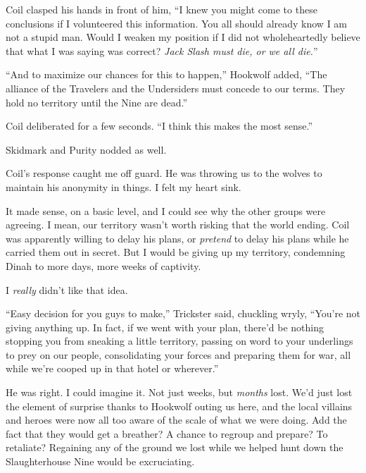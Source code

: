 Coil clasped his hands in front of him, ``I knew you might come to these conclusions if I volunteered this information.  You all should already know I am not a stupid man.  Would I weaken my position if I did not wholeheartedly believe that what I was saying was correct?  \emph{Jack Slash must die, or we all die.}''



``And to maximize our chances for this to happen,'' Hookwolf added, ``The alliance of the Travelers and the Undersiders must concede to our terms.  They hold no territory until the Nine are dead.''



Coil deliberated for a few seconds.  ``I think this makes the most sense.''



Skidmark and Purity nodded as well.



Coil's response caught me off guard.  He was throwing us to the wolves to maintain his anonymity in things.  I felt my heart sink.



It made sense, on a basic level, and I could see why the other groups were agreeing.  I mean, our territory wasn't worth risking that the world ending.  Coil was apparently willing to delay his plans, or \emph{pretend }to delay his plans while he carried them out in secret.  But I would be giving up my territory, condemning Dinah to more days, more weeks of captivity.



I \emph{really} didn't like that idea.



``Easy decision for you guys to make,'' Trickster said, chuckling wryly, ``You're not giving anything up.  In fact, if we went with your plan, there'd be nothing stopping you from sneaking a little territory, passing on word to your underlings to prey on our people, consolidating your forces and preparing them for war, all while we're cooped up in that hotel or wherever.''



He was right.  I could imagine it.  Not just weeks, but \emph{months} lost.  We'd just lost the element of surprise thanks to Hookwolf outing us here, and the local villains and heroes were now all too aware of the scale of what we were doing.  Add the fact that they would get a breather?  A chance to regroup and prepare?  To retaliate?  Regaining any of the ground we lost while we helped hunt down the Slaughterhouse Nine would be excruciating.



